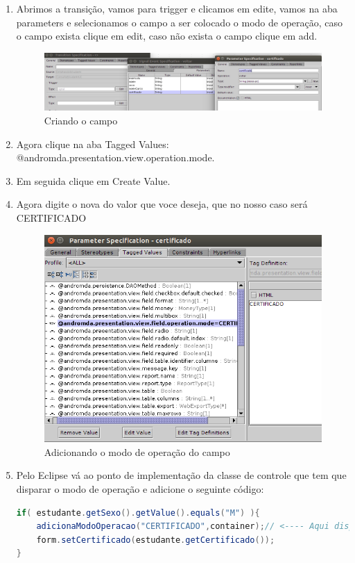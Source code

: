 \begin{enumerate}

\item Abrimos a transição, vamos para trigger e clicamos em edite, vamos na aba
parameters e selecionamos o campo a ser colocado o modo de operação, caso o
campo exista clique em edit, caso não exista o campo clique em add.

\begin{figure}[H]
	\centering
	\includegraphics[scale=0.75]{files/imgs/operation-mode-00.png}
	\caption{Criando o campo}
	\label{criando_campo_modo_operacao}
\end{figure}

\item Agora clique na aba Tagged Values:
@andromda.presentation.view.operation.mode.
\item Em seguida clique em Create Value.
\item Agora digite o nova do valor que voce deseja, que no nosso caso será
CERTIFICADO

\begin{figure}[H]
	\centering
	\includegraphics[scale=0.75]{files/imgs/operation-mode-01.png}
	\caption{Adicionando o modo de operação do campo}
	\label{aicionando_modo_operacao_campo}
\end{figure}

\item Pelo Eclipse vá ao ponto de implementação da classe de controle que tem
que disparar o modo de operação e adicione o seguinte código:

\begin{lstlisting}[language=java, frame=single, breaklines=true]
if( estudante.getSexo().getValue().equals("M") ){
	adicionaModoOperacao("CERTIFICADO",container);// <---- Aqui disparamos o MODO OPERACAO
	form.setCertificado(estudante.getCertificado());
}
\end{lstlisting}

\end{enumerate}

